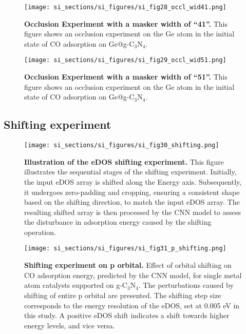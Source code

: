 \begin{figure}
  \centering
  \texttt{[image: si\_sections/si\_figures/si\_fig28\_occl\_wid41.png]}
  \caption{\textbf{Occlusion Experiment with a masker width of “41”.}
  This figure shows an occlusion experiment on the Ge atom in
  the initial state of CO adsorption on Ge@g-C$_3$N$_4$.}
  \label{si_fig28:occl_wid41}
\end{figure}


\begin{figure}
  \centering
  \texttt{[image: si\_sections/si\_figures/si\_fig29\_occl\_wid51.png]}
  \caption{\textbf{Occlusion Experiment with a masker width of “51”.}
  This figure shows an occlusion experiment on the Ge atom in
  the initial state of CO adsorption on Ge@g-C$_3$N$_4$.}
  \label{si_fig29:occl_wid51}
\end{figure}


\subsection{Shifting experiment}


\begin{figure}
  \centering
  \texttt{[image: si\_sections/si\_figures/si\_fig30\_shifting.png]}
  \caption{\textbf{Illustration of the eDOS shifting experiment.}
  This figure illustrates the sequential stages of the shifting experiment.
  Initially, the input eDOS array is shifted along the Energy axis.
  Subsequently, it undergoes zero-padding and cropping,
  ensuring a consistent shape based on the shifting direction, to match the input eDOS array.
  The resulting shifted array is then processed by the CNN model to
  assess the disturbance in adsorption energy caused by the shifting operation.}
  \label{si_fig30:shifting}
\end{figure}


\begin{figure}
  \centering
  \texttt{[image: si\_sections/si\_figures/si\_fig31\_p\_shifting.png]}
  \caption{\textbf{Shifting experiment on p orbital.}
  Effect of orbital shifting on CO adsorption energy, predicted by the CNN model,
  for single metal atom catalysts supported on g-C$_3$N$_4$.
  The perturbations caused by shifting of entire p orbital are presented.
  The shifting step size corresponds to the energy resolution of the eDOS, set at 0.005 eV in this study.
  A positive eDOS shift indicates a shift towards higher energy levels, and vice versa.}
  \label{si_fig31:p_shifting}
\end{figure}
